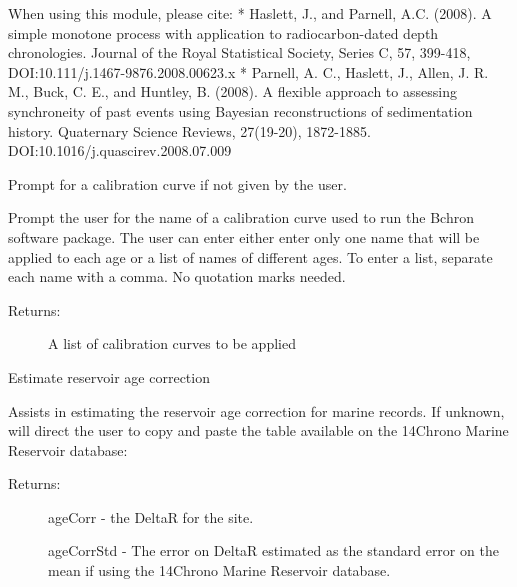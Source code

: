\documentclass[letterpaper,10pt,english]{sphinxmanual}
\begin{document}
When using this module, please cite:
* Haslett, J., and Parnell, A.C. (2008). A simple monotone process with application to radiocarbon-dated depth chronologies. Journal of the Royal Statistical Society, Series C, 57, 399-418, DOI:10.111/j.1467-9876.2008.00623.x
* Parnell, A. C., Haslett, J., Allen, J. R. M., Buck, C. E.,  and Huntley, B. (2008). A flexible approach to assessing  synchroneity of past events using Bayesian reconstructions of sedimentation history. Quaternary Science Reviews, 27(19-20), 1872-1885. DOI:10.1016/j.quascirev.2008.07.009

\begin{fulllineitems}
\label{\detokenize{RBchron:pyleoclim.RBchron.chooseCalCurves}}
Prompt for a calibration curve if not given by the user.

Prompt the user for the name of a calibration curve used to run the Bchron 
software package. The user can enter either enter only one name that will
be applied to each age or a list of names of different ages. To enter a list, 
separate each name with a comma. No quotation marks needed.
\begin{description}
\item[{Returns:}] \leavevmode
A list of calibration curves to be applied

\end{description}

\end{fulllineitems}


\begin{fulllineitems}
\label{\detokenize{RBchron:pyleoclim.RBchron.reservoirAgeCorrection}}
Estimate reservoir age correction

Assists in estimating the reservoir age correction for marine records.
If unknown, will direct the user to copy and paste the table available
on the 14Chrono Marine Reservoir database: 
\begin{description}
\item[{Returns:}] \leavevmode
ageCorr -  the DeltaR for the site.

ageCorrStd - The error on DeltaR estimated as the standard error on the 
mean if using the 14Chrono Marine Reservoir database.

\end{description}

\end{fulllineitems}
\end{document}
